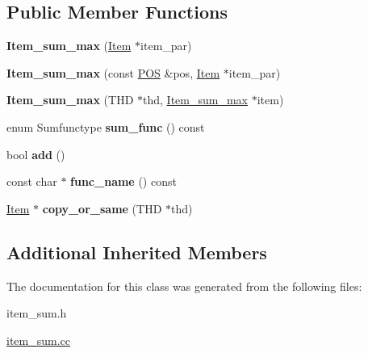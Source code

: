 \subsection*{Public Member Functions}
\begin{DoxyCompactItemize}
\item 
\mbox{\label{classItem__sum__max_a08694788a963c7ec71ba5f6f2a705949}} 
{\bfseries Item\+\_\+sum\+\_\+max} (\mbox{\hyperlink{classItem}{Item}} $\ast$item\+\_\+par)
\item 
\mbox{\label{classItem__sum__max_a1ff49d88152e719e1db8f42261eef8a2}} 
{\bfseries Item\+\_\+sum\+\_\+max} (const \mbox{\hyperlink{structYYLTYPE}{P\+OS}} \&pos, \mbox{\hyperlink{classItem}{Item}} $\ast$item\+\_\+par)
\item 
\mbox{\label{classItem__sum__max_aabdcfe64ec217dee4a311db7bac4f7de}} 
{\bfseries Item\+\_\+sum\+\_\+max} (T\+HD $\ast$thd, \mbox{\hyperlink{classItem__sum__max}{Item\+\_\+sum\+\_\+max}} $\ast$item)
\item 
\mbox{\label{classItem__sum__max_a836f2853071a1700c2607c804f217f84}} 
enum Sumfunctype {\bfseries sum\+\_\+func} () const
\item 
\mbox{\label{classItem__sum__max_a98446be75c524d7b087524bb6cc9be1b}} 
bool {\bfseries add} ()
\item 
\mbox{\label{classItem__sum__max_a33b62a9fd18acdd4c3f5e336632a5fb0}} 
const char $\ast$ {\bfseries func\+\_\+name} () const
\item 
\mbox{\label{classItem__sum__max_ab54ff5ba17e5e3a89871d3fc4fd1948e}} 
\mbox{\hyperlink{classItem}{Item}} $\ast$ {\bfseries copy\+\_\+or\+\_\+same} (T\+HD $\ast$thd)
\end{DoxyCompactItemize}
\subsection*{Additional Inherited Members}


The documentation for this class was generated from the following files\+:\begin{DoxyCompactItemize}
\item 
item\+\_\+sum.\+h\item 
\mbox{\hyperlink{item__sum_8cc}{item\+\_\+sum.\+cc}}\end{DoxyCompactItemize}
